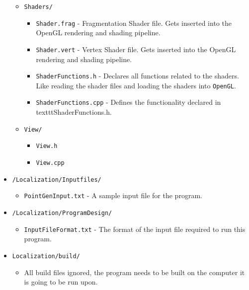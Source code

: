 \documentclass[a4paper,11pt]{article}
\begin{document}
\begin{itemize}
\begin{itemize}
            \item \texttt{Shaders/}
                \begin{itemize}
                \item \texttt{Shader.frag} - Fragmentation Shader file. Gets inserted into the OpenGL rendering and shading pipeline. 
                \item \texttt{Shader.vert} - Vertex Shader file. Gets inserted into the OpenGL rendering and shading pipeline.
                \item \texttt{ShaderFunctions.h} - Declares all functions related to the shaders. Like reading the shader files and loading the shaders into \texttt{OpenGL}.
                \item \texttt{ShaderFunctions.cpp} - Defines the functionality declared in texttt{ShaderFunctions.h}.
                \end{itemize}
            \item \texttt{View/}
                \begin{itemize}
                \item \texttt{View.h}
                \item \texttt{View.cpp}
                \end{itemize}
            \end{itemize}%
        \item \texttt{/Localization/Inputfiles/}
	    \begin{itemize} 
            \item \texttt{PointGenInput.txt} - A sample input file for the program. 
            \end{itemize}
        \item \texttt{/Localization/ProgramDesign/}
            \begin{itemize}
            \item \texttt{InputFileFormat.txt} - The format of the input file required to run this program.
            \end{itemize}
        \item \texttt{Localization/build/}
	    \begin{itemize}
	    \item All build files ignored, the program needs to be built on the computer it is going to be run upon.
	    \end{itemize}
        \end{itemize} %
        \newpage

        
\end{document}
